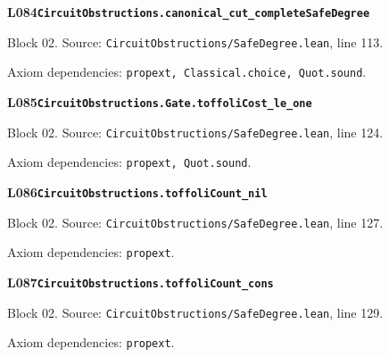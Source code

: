 \par\medskip
\begin{minipage}{\linewidth}
\hypertarget{L084}{}
{\small\sffamily\bfseries\color{ink}L084\quad\nolinkurl{CircuitObstructions.canonical_cut_completeSafeDegree}}\par
{\scriptsize\sffamily\color{muted}Block 02. Source: \nolinkurl{CircuitObstructions/SafeDegree.lean}, line 113.}\par
{}
{\scriptsize\sffamily\color{muted}Axiom dependencies: \nolinkurl{propext, Classical.choice, Quot.sound}.}
\end{minipage}\par\medskip
\begin{minipage}{\linewidth}
\hypertarget{L085}{}
{\small\sffamily\bfseries\color{ink}L085\quad\nolinkurl{CircuitObstructions.Gate.toffoliCost_le_one}}\par
{\scriptsize\sffamily\color{muted}Block 02. Source: \nolinkurl{CircuitObstructions/SafeDegree.lean}, line 124.}\par
{}
{\scriptsize\sffamily\color{muted}Axiom dependencies: \nolinkurl{propext, Quot.sound}.}
\end{minipage}\par\medskip
\begin{minipage}{\linewidth}
\hypertarget{L086}{}
{\small\sffamily\bfseries\color{ink}L086\quad\nolinkurl{CircuitObstructions.toffoliCount_nil}}\par
{\scriptsize\sffamily\color{muted}Block 02. Source: \nolinkurl{CircuitObstructions/SafeDegree.lean}, line 127.}\par
{}
{\scriptsize\sffamily\color{muted}Axiom dependencies: \nolinkurl{propext}.}
\end{minipage}\par\medskip
\begin{minipage}{\linewidth}
\hypertarget{L087}{}
{\small\sffamily\bfseries\color{ink}L087\quad\nolinkurl{CircuitObstructions.toffoliCount_cons}}\par
{\scriptsize\sffamily\color{muted}Block 02. Source: \nolinkurl{CircuitObstructions/SafeDegree.lean}, line 129.}\par
{}
{\scriptsize\sffamily\color{muted}Axiom dependencies: \nolinkurl{propext}.}
\end{minipage}\par\medskip
